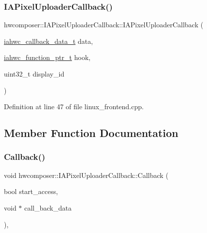 \subsubsection{\texorpdfstring{I\+A\+Pixel\+Uploader\+Callback()}{IAPixelUploaderCallback()}}
{\footnotesize\ttfamily hwcomposer\+::\+I\+A\+Pixel\+Uploader\+Callback\+::\+I\+A\+Pixel\+Uploader\+Callback (\begin{DoxyParamCaption}\item[{\mbox{\hyperlink{iahwc_8h_a07fb4f73baa8a0cfbd40f64071e56a7c}{iahwc\+\_\+callback\+\_\+data\+\_\+t}}}]{data,  }\item[{\mbox{\hyperlink{iahwc_8h_a214bf51cce821fdb7b24210088c12cad}{iahwc\+\_\+function\+\_\+ptr\+\_\+t}}}]{hook,  }\item[{uint32\+\_\+t}]{display\+\_\+id }\end{DoxyParamCaption})\hspace{0.3cm}{\ttfamily [inline]}}



Definition at line 47 of file linux\+\_\+frontend.\+cpp.


\begin{DoxyCode}{0}
\end{DoxyCode}


\subsection{Member Function Documentation}
\mbox{\label{classhwcomposer_1_1IAPixelUploaderCallback_aadcf6756b46e8d237ac52a87199fc4eb}} 
\subsubsection{\texorpdfstring{Callback()}{Callback()}}
{\footnotesize\ttfamily void hwcomposer\+::\+I\+A\+Pixel\+Uploader\+Callback\+::\+Callback (\begin{DoxyParamCaption}\item[{bool}]{start\+\_\+access,  }\item[{void $\ast$}]{call\+\_\+back\+\_\+data }\end{DoxyParamCaption})\hspace{0.3cm}{\ttfamily [inline]}, {\ttfamily [virtual]}}



